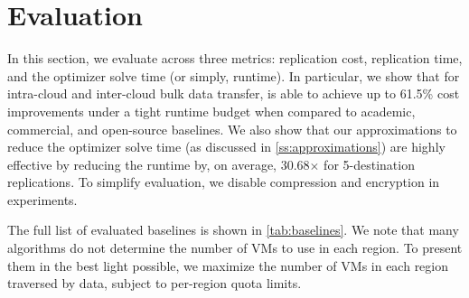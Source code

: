 \section{Evaluation}

In this section, we evaluate \sys{} across three metrics: replication cost, replication time, and the optimizer solve time (or simply, runtime).
% 
In particular, we show that for intra-cloud and inter-cloud bulk data transfer, \sys{} is able to achieve up to 61.5\% cost improvements under a tight runtime budget when compared to academic, commercial, and open-source baselines.
% 
We also show that our approximations to reduce the optimizer solve time (as discussed in \cref{ss:approximations}) are highly effective by reducing the runtime by, on average, 30.68$\times$ for 5-destination replications. To simplify evaluation, we disable compression and encryption in experiments. 
%

The full list of evaluated baselines is shown in \cref{tab:baselines}.
We note that many algorithms do not determine the number of VMs to use in each region.
To present them in the best light possible, we maximize the number of VMs in each region traversed by data, subject to per-region quota limits.



